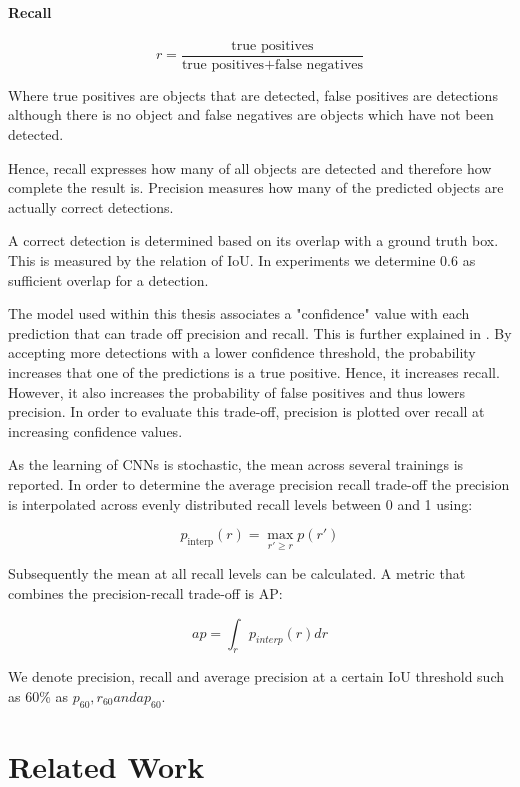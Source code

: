 \paragraph{Recall}
$$r = \frac{\text{true positives}}{\text{true positives} + \text{false negatives}}$$

Where true positives are objects that are detected, false positives are detections although there is no object and false negatives are objects which have not been detected.

Hence, recall expresses how many of all objects are detected and therefore how complete the result is. Precision measures how many of the predicted objects are actually correct detections.

A correct detection is determined based on its overlap with a ground truth box. This is measured by the relation of \ac{IoU}. In experiments we determine 0.6 as sufficient overlap for a detection. 

The model used within this thesis associates a "confidence" value with each prediction that can trade off precision and recall. This is further explained in . By accepting more detections with a lower confidence threshold, the probability increases that one of the predictions is a true positive. Hence, it increases recall. However, it also increases the probability of false positives and thus lowers precision. In order to evaluate this trade-off, precision is plotted over recall at increasing confidence values.

As the learning of \acp{CNN} is stochastic, the mean across several trainings is reported. In order to determine the average precision recall trade-off the precision is interpolated across evenly distributed recall levels between 0 and 1 using:

$$ p_\text{interp}(r) = \max\limits_{r' \geq r} p(r')$$

Subsequently the mean at all recall levels can be calculated. A metric that combines the precision-recall trade-off is \ac{AP}:


$$ ap = \int_{r}p_{interp}(r) dr$$


We denote precision, recall and average precision at a certain \ac{IoU} threshold such as 60\% as $p_{60},r_{60} and ap_{60}$.

\section{Related Work}

